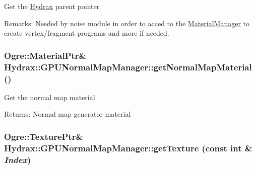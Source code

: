 Get the \hyperlink{class_hydrax_1_1_hydrax}{Hydrax} parent pointer \begin{Desc}
\item[Remarks:]Needed by noise module in order to acced to the \hyperlink{class_hydrax_1_1_material_manager}{MaterialManager} to create vertex/fragment programs and more if needed. \end{Desc}
\hypertarget{class_hydrax_1_1_g_p_u_normal_map_manager_03dbe50e39daea6c40ac192c0afa1936}{
\subsubsection[{getNormalMapMaterial}]{\setlength{\rightskip}{0pt plus 5cm}Ogre::MaterialPtr\& Hydrax::GPUNormalMapManager::getNormalMapMaterial ()}}
\label{class_hydrax_1_1_g_p_u_normal_map_manager_03dbe50e39daea6c40ac192c0afa1936}


Get the normal map material \begin{Desc}
\item[Returns:]Normal map generator material \end{Desc}
\hypertarget{class_hydrax_1_1_g_p_u_normal_map_manager_b37c3778df109d139c6136fbda3abe80}{
\subsubsection[{getTexture}]{\setlength{\rightskip}{0pt plus 5cm}Ogre::TexturePtr\& Hydrax::GPUNormalMapManager::getTexture (const int \& {\em Index})}}
\label{class_hydrax_1_1_g_p_u_normal_map_manager_b37c3778df109d139c6136fbda3abe80}


